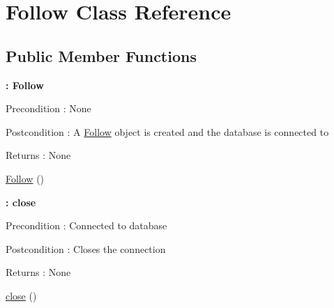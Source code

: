 \hypertarget{class_follow}{}\section{Follow Class Reference}
\label{class_follow}
\subsection*{Public Member Functions}
\begin{Indent}{\bf \+: Follow}\par
{\em \begin{DoxyPrecond}{Precondition}
\+: None 
\end{DoxyPrecond}
\begin{DoxyPostcond}{Postcondition}
\+: A \hyperlink{class_follow}{Follow} object is created and the database is connected to 
\end{DoxyPostcond}
\begin{DoxyReturn}{Returns}
\+: None 
\end{DoxyReturn}
}\begin{DoxyCompactItemize}
\item 
\hyperlink{class_follow_a84352201e33bab0eb302bb4454894646}{Follow} ()
\end{DoxyCompactItemize}
\end{Indent}
\begin{Indent}{\bf \+: close}\par
{\em \begin{DoxyPrecond}{Precondition}
\+: Connected to database 
\end{DoxyPrecond}
\begin{DoxyPostcond}{Postcondition}
\+: Closes the connection 
\end{DoxyPostcond}
\begin{DoxyReturn}{Returns}
\+: None 
\end{DoxyReturn}
}\begin{DoxyCompactItemize}
\item 
\hyperlink{class_follow_aa69c8bf1f1dcf4e72552efff1fe3e87e}{close} ()
\end{DoxyCompactItemize}
\end{Indent}
